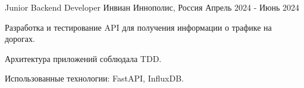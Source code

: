 

\begin{cventries}

  \cventry
    {Junior Backend Developer} %
    {Инвиан} %
    {Иннополис, Россия} %
    {Апрель 2024 - Июнь 2024} %
    {
      \begin{cvitems} %
        \item {Разработка и тестирование API для получения информации о трафике на дорогах. }
        \item {Архитектура приложений соблюдала TDD. }
        \item {Использованные технологии: FastAPI, InfluxDB. }
      \end{cvitems}
    }
\end{cventries}
